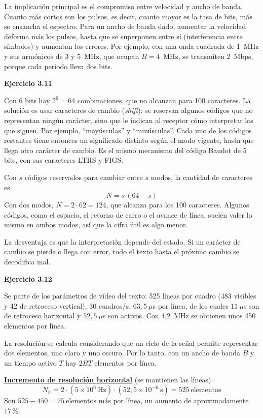 \documentclass[11pt,a4paper]{article}
\begin{document}
La implicación principal es el compromiso entre velocidad y ancho de banda. Cuanto más cortos son los pulsos, es decir, cuanto mayor es la tasa de bits, más se ensancha el espectro. Para un ancho de banda dado, aumentar la velocidad deforma más los pulsos, hasta que se superponen entre sí (interferencia entre símbolos) y aumentan los errores. Por ejemplo, con una onda cuadrada de 1~MHz y sus armónicos de 3 y 5~MHz, que ocupan $B = 4$~MHz, se transmiten 2~Mbps, porque cada período lleva dos bits.

\vspace{0.3cm}
\noindent\textbf{Ejercicio 3.11}\par
Con 6 bits hay $2^6 = 64$ combinaciones, que no alcanzan para 100 caracteres. La solución es usar caracteres de cambio (\emph{shift}): se reservan algunos códigos que no representan ningún carácter, sino que le indican al receptor cómo interpretar los que siguen. Por ejemplo, ``mayúsculas'' y ``minúsculas''. Cada uno de los códigos restantes tiene entonces un significado distinto según el modo vigente, hasta que llega otro carácter de cambio. Es el mismo mecanismo del código Baudot de 5 bits, con sus caracteres LTRS y FIGS.

Con $s$ códigos reservados para cambiar entre $s$ modos, la cantidad de caracteres es
\[
  N = s\,(64 - s)
\]
Con dos modos, $N = 2 \cdot 62 = 124$, que alcanza para los 100 caracteres. Algunos códigos, como el espacio, el retorno de carro o el avance de línea, suelen valer lo mismo en ambos modos, así que la cifra útil es algo menor.

La desventaja es que la interpretación depende del estado. Si un carácter de cambio se pierde o llega con error, todo el texto hasta el próximo cambio se decodifica mal.

\vspace{0.3cm}
\noindent\textbf{Ejercicio 3.12}\par
Se parte de los parámetros de vídeo del texto: 525 líneas por cuadro (483 visibles y 42 de retroceso vertical), 30 cuadros/s, $63{,}5~\mu$s por línea, de los cuales $11~\mu$s son de retroceso horizontal y $52{,}5~\mu$s son activos. Con 4{,}2~MHz se obtienen unos 450 elementos por línea.

La resolución se calcula considerando que un ciclo de la señal permite representar dos elementos, uno claro y uno oscuro. Por lo tanto, con un ancho de banda $B$ y un tiempo activo $T$ hay $2BT$ elementos por línea.

\noindent\underline{\textbf{Incremento de resolución horizontal}} (se mantienen las líneas):
\[
  N_h = 2 \cdot (5 \times 10^6~\text{Hz}) \cdot (52{,}5 \times 10^{-6}~\text{s}) = 525~\text{elementos}
\]
Son $525 - 450 = \boxed{75~\text{elementos más por línea}}$, un aumento de aproximadamente $17\,\%$.
\end{document}
